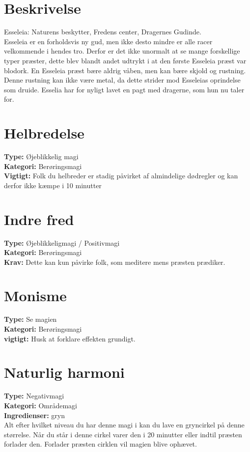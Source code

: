 \section{Beskrivelse}
Esseleia: Naturens beskytter, Fredens center, Dragernes Gudinde.\\ Esseleia er en forholdsvis ny gud, men ikke desto mindre er alle racer velkommende i hendes tro. Derfor er det ikke unormalt at se mange forskellige typer præster, dette blev blandt andet udtrykt i at den første Esseleia præst var blodork. En Esseleia præst bære aldrig våben, men kan bære skjold og rustning. Denne rustning kan ikke være metal, da dette strider mod Esseleias oprindelse som druide. Esselia har for nyligt lavet en pagt med dragerne, som hun nu taler for.

\section{Helbredelse}
\textbf{Type:} Øjeblikkelig magi \\
\textbf{Kategori:} Berøringsmagi\\
\textbf{Vigtigt:} Folk du helbreder er stadig påvirket af almindelige dødregler og kan derfor ikke kæmpe i 10 minutter

\section{Indre fred}
\textbf{Type:} Øjeblikkeligmagi / Positivmagi\\
\textbf{Kategori:} Berøringsmagi\\
\textbf{Krav:} Dette kan kun påvirke folk, som meditere mens præsten prædiker.

\section{Monisme}
\textbf{Type:} Se magien\\
\textbf{Kategori:} Berøringsmagi\\
\textbf{vigtigt:} Husk at forklare effekten grundigt.


\section{Naturlig harmoni}
\textbf{Type:} Negativmagi\\
\textbf{Kategori:} Områdemagi\\
\textbf{Ingredienser:} gryn\\
Alt efter hvilket niveau du har denne magi i kan du lave en gryncirkel på denne størrelse. Når du står i denne cirkel varer den i 20 minutter eller indtil præsten forlader den. Forlader præsten cirklen vil magien blive ophævet.
